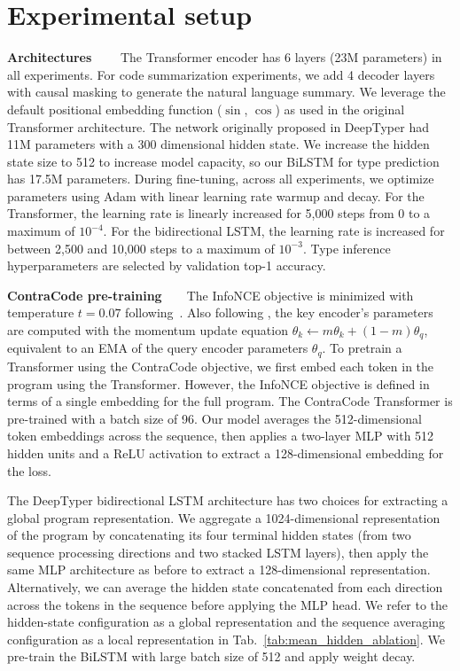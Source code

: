 \documentclass[11pt]{article}
\newcommand{\ours}[0]{ContraCode}
\begin{document}
\section{Experimental setup}
\textbf{Architectures}~~~~
The Transformer encoder has 6 layers (23M parameters) in all experiments. For code summarization experiments, we add 4 decoder layers with causal masking to generate the natural language summary.
We leverage the default positional embedding function ($\sin$, $\cos$) as used in the original Transformer architecture. The network originally proposed in DeepTyper \citep{hellendoorn2018deep} had 11M parameters with a 300 dimensional hidden state. We increase the hidden state size to 512 to increase model capacity, so our BiLSTM for type prediction has 17.5M parameters.
During fine-tuning, across all experiments, we optimize parameters using Adam with linear learning rate warmup and decay. For the Transformer, the learning rate is linearly increased for 5,000 steps from 0 to a maximum of $10^{-4}$. For the bidirectional LSTM, the learning rate is increased for between 2,500 and 10,000 steps to a maximum of $10^{-3}$. Type inference hyperparameters are selected by validation top-1 accuracy.

\textbf{\ours{} pre-training}~~~~The InfoNCE objective is minimized with temperature $t=0.07$ following~\citet{he2019momentum}. Also following \citet{he2019momentum}, the key encoder's parameters are computed with the momentum update equation $\theta_{k} \leftarrow m\theta_{k} + (1-m)\theta_{q}$, equivalent to an EMA of the query encoder parameters $\theta_{q}$. To pretrain a Transformer using the \ours{} objective, we first embed each token in the program using the Transformer. However, the InfoNCE objective is defined in terms of a single embedding for the full program. The \ours{} Transformer is pre-trained with a batch size of 96. Our model averages the 512-dimensional token embeddings across the sequence, then applies a two-layer MLP with 512 hidden units and a ReLU activation to extract a 128-dimensional embedding for the loss.

The DeepTyper bidirectional LSTM architecture has two choices for extracting a global program representation. We aggregate a 1024-dimensional representation of the program by concatenating its four terminal hidden states (from two sequence processing directions and two stacked LSTM layers), then apply the same MLP architecture as before to extract a 128-dimensional representation. Alternatively, we can average the hidden state concatenated from each direction across the tokens in the sequence before applying the MLP head. We refer to the hidden-state configuration as a global representation and the sequence averaging configuration as a local representation in Tab.~\ref{tab:mean_hidden_ablation}. We pre-train the BiLSTM with large batch size of 512 and apply weight decay.
\end{document}
